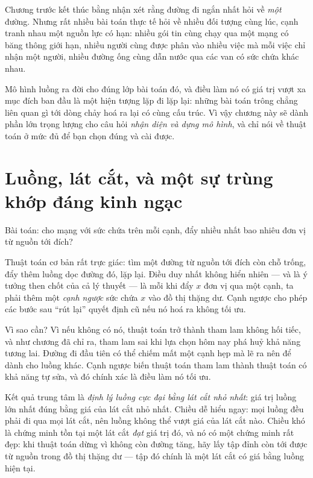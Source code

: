 \documentclass[../../algorithm.tex]{subfiles}
\begin{document}
Chương trước kết thúc bằng nhận xét rằng đường đi ngắn nhất hỏi về \emph{một} đường. Nhưng rất nhiều bài toán thực tế hỏi về nhiều đối tượng cùng lúc, cạnh tranh nhau một nguồn lực có hạn: nhiều gói tin cùng chạy qua một mạng có băng thông giới hạn, nhiều người cùng được phân vào nhiều việc mà mỗi việc chỉ nhận một người, nhiều đường ống cùng dẫn nước qua các van có sức chứa khác nhau.

Mô hình luồng ra đời cho đúng lớp bài toán đó, và điều làm nó có giá trị vượt xa mục đích ban đầu là một hiện tượng lặp đi lặp lại: những bài toán trông chẳng liên quan gì tới dòng chảy hoá ra lại có cùng cấu trúc. Vì vậy chương này sẽ dành phần lớn trọng lượng cho câu hỏi \emph{nhận diện và dựng mô hình}, và chỉ nói về thuật toán ở mức đủ để bạn chọn đúng và cài được.

\section{Luồng, lát cắt, và một sự trùng khớp đáng kinh ngạc}

Bài toán: cho mạng với sức chứa trên mỗi cạnh, đẩy nhiều nhất bao nhiêu đơn vị từ nguồn tới đích?

Thuật toán cơ bản rất trực giác: tìm một đường từ nguồn tới đích còn chỗ trống, đẩy thêm luồng dọc đường đó, lặp lại. Điều duy nhất không hiển nhiên --- và là ý tưởng then chốt của cả lý thuyết --- là mỗi khi đẩy \(x\) đơn vị qua một cạnh, ta phải thêm một \emph{cạnh ngược} sức chứa \(x\) vào đồ thị thặng dư. Cạnh ngược cho phép các bước sau ``rút lại'' quyết định cũ nếu nó hoá ra không tối ưu.

Vì sao cần? Vì nếu không có nó, thuật toán trở thành tham lam không hối tiếc, và như chương  đã chỉ ra, tham lam sai khi lựa chọn hôm nay phá huỷ khả năng tương lai. Đường đi đầu tiên có thể chiếm mất một cạnh hẹp mà lẽ ra nên để dành cho luồng khác. Cạnh ngược biến thuật toán tham lam thành thuật toán có khả năng tự sửa, và đó chính xác là điều làm nó tối ưu.

Kết quả trung tâm là \emph{định lý luồng cực đại bằng lát cắt nhỏ nhất}: giá trị luồng lớn nhất đúng bằng giá của lát cắt nhỏ nhất. Chiều dễ hiểu ngay: mọi luồng đều phải đi qua mọi lát cắt, nên luồng không thể vượt giá của lát cắt nào. Chiều khó là chứng minh tồn tại một lát cắt \emph{đạt} giá trị đó, và nó có một chứng minh rất đẹp: khi thuật toán dừng vì không còn đường tăng, hãy lấy tập đỉnh còn tới được từ nguồn trong đồ thị thặng dư --- tập đó chính là một lát cắt có giá bằng luồng hiện tại.
\end{document}
